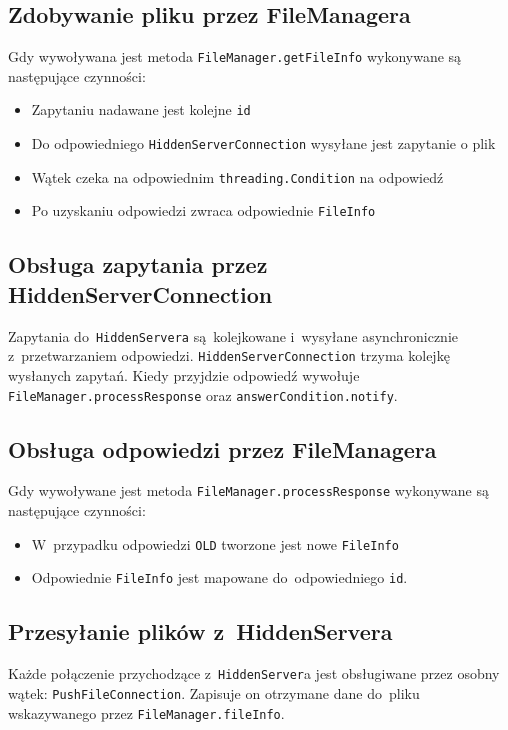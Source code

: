\documentclass[a4paper,notitlepage]{article}
\begin{document}
\subsection{Zdobywanie pliku przez FileManagera}
Gdy wywoływana jest metoda \texttt{FileManager.getFileInfo} 
wykonywane są następujące czynności:
\begin{itemize}
\item Zapytaniu nadawane jest kolejne \texttt{id}
\item Do odpowiedniego \texttt{HiddenServerConnection} wysyłane jest zapytanie 
o plik
\item Wątek czeka na odpowiednim \texttt{threading.Condition} na odpowiedź
\item Po uzyskaniu odpowiedzi zwraca odpowiednie \texttt{FileInfo}
\end{itemize}

\subsection{Obsługa zapytania przez HiddenServerConnection}
Zapytania do~\texttt{HiddenServera} są~kolejkowane i~wysyłane
asynchronicznie z~przetwarzaniem odpowiedzi. 
\texttt{Hid\-den\-Server\-Connection}
trzyma kolejkę wysłanych zapytań. Kiedy przyjdzie odpowiedź wywołuje 
\texttt{File\-Manager\-.process\-Response} oraz \texttt{answerCondition.notify}.

\subsection{Obsługa odpowiedzi przez FileManagera}
Gdy wywoływane jest metoda \texttt{FileManager.processResponse}
wykonywane są następujące czynności:
\begin{itemize}
\item W~przypadku odpowiedzi \texttt{OLD} tworzone jest 
nowe \texttt{FileInfo}
\item Odpowiednie \texttt{FileInfo} jest mapowane do~odpowiedniego 
\texttt{id}.
\end{itemize}

\subsection{Przesyłanie plików z~HiddenServera}
Każde połączenie przychodzące z~\texttt{HiddenServer}a jest obsługiwane przez
osobny wątek: \texttt{PushFileConnection}. Zapisuje on otrzymane dane do~pliku
wskazywanego przez \texttt{FileManager.fileInfo}.
\end{document}
